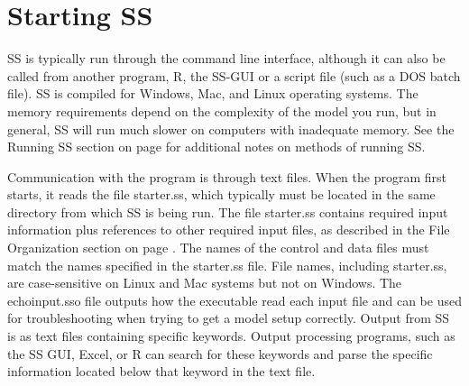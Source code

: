 \section{Starting SS}
SS is typically run through the command line interface, although it can also be called from another program, R, the SS-GUI or a script file (such as a DOS batch file). SS is compiled for Windows, Mac, and Linux operating systems. The memory requirements depend on the complexity of the model you run, but in general, SS will run much slower on computers with inadequate memory. See the Running SS section on page \pageref{sec:RunningSS} for additional notes on methods of running SS.

Communication with the program is through text files.  When the program first starts, it reads the file starter.ss, which typically must be located in the same directory from which SS is being run.  The file starter.ss contains required input information plus references to other required input files, as described in the File Organization section on page \pageref{FileOrganization}.  The names of the control and data files must match the names specified in the starter.ss file.  File names, including starter.ss, are case-sensitive on Linux and Mac systems but not on Windows. The echoinput.sso file outputs how the executable read each input file and can be used for troubleshooting when trying to get a model setup correctly.  Output from SS is as text files containing specific keywords.  Output processing programs, such as the SS GUI, Excel, or R can search for these keywords and parse the specific information located below that keyword in the text file.

